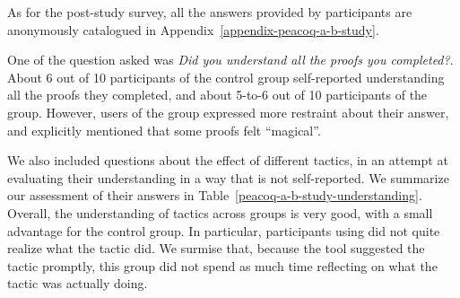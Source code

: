 As for the post-study survey, all the answers provided by participants are
anonymously catalogued in Appendix~\ref{appendix-peacoq-a-b-study}.

One of the question asked was \emph{Did you understand all the proofs you
completed?}.  About 6 out of 10 participants of the control group self-reported
understanding all the proofs they completed, and about 5-to-6 out of 10
participants of the \PeaCoq{} group.  However, users of the \PeaCoq{} group
expressed more restraint about their answer, and explicitly mentioned that some
proofs felt ``magical''.

We also included questions about the effect of different tactics, in an attempt
at evaluating their understanding in a way that is not self-reported.  We
summarize our assessment of their answers in
Table~\ref{peacoq-a-b-study-understanding}.  Overall, the understanding of
tactics across groups is very good, with a small advantage for the control
group.  In particular, participants using \PeaCoq{} did not quite realize what
the  tactic did.  We surmise that, because the tool suggested
the tactic promptly, this group did not spend as much time reflecting on what
the tactic was actually doing.

